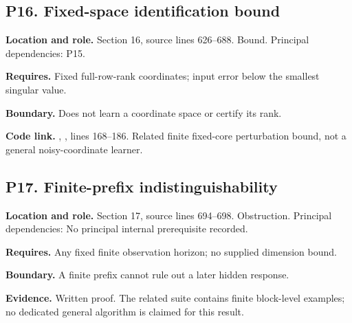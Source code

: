 \documentclass[11pt,oneside,openany]{book}
\numberwithin{equation}{section}
\begin{document}
\par\noindent\begin{minipage}{\textwidth}
\subsection{P16. Fixed-space identification
bound}\label{LSMRegister:p16.-fixed-space-identification-bound}

\textbf{Location and role.} Section 16, source lines 626--688. Bound.
Principal dependencies: P15.

\textbf{Requires.} Fixed full-row-rank coordinates; input error below
the smallest singular value.

\textbf{Boundary.} Does not learn a coordinate space or certify its
rank.

\textbf{Code link.} ,
, lines 168--186. Related finite fixed-core
perturbation bound, not a general noisy-coordinate learner.
\end{minipage}\par\medskip

\par\noindent\begin{minipage}{\textwidth}
\subsection{P17. Finite-prefix
indistinguishability}\label{LSMRegister:p17.-finite-prefix-indistinguishability}

\textbf{Location and role.} Section 17, source lines 694--698.
Obstruction. Principal dependencies: No principal internal prerequisite
recorded.

\textbf{Requires.} Any fixed finite observation horizon; no supplied
dimension bound.

\textbf{Boundary.} A finite prefix cannot rule out a later hidden
response.

\textbf{Evidence.} Written proof. The related suite contains finite
block-level examples; no dedicated general algorithm is claimed for this
result.
\end{minipage}\par\medskip
\end{document}
